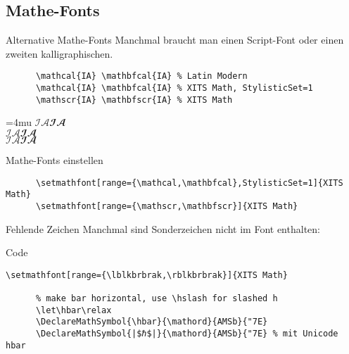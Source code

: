 \subsection{Mathe-Fonts}\label{sec:mathfonts}

\begin{frame}[fragile]{Alternative Mathe-Fonts}
  Manchmal braucht man einen Script-Font oder einen zweiten kalligraphischen.
  \vspace{1em}
  \begin{CodeExample}{0.83}
    \begin{lstlisting}
      \mathcal{IA} \mathbfcal{IA} % Latin Modern
      \mathcal{IA} \mathbfcal{IA} % XITS Math, StylisticSet=1
      \mathscr{IA} \mathbfscr{IA} % XITS Math
    \end{lstlisting}
  \CodeResult
    \Umathordordspacing\textstyle=4mu
    $\mathcal{I A} \mathbfcal{I A}$ \\
    { $\mathcal{I A} \mathbfcal{I A}$} \\
    $\mathscr{I A} \mathbfscr{I A}$
  \end{CodeExample}

  \begin{block}{Mathe-Fonts einstellen}
    \begin{lstlisting}
      \setmathfont[range={\mathcal,\mathbfcal},StylisticSet=1]{XITS Math}
      \setmathfont[range={\mathscr,\mathbfscr}]{XITS Math}
    \end{lstlisting}
  \end{block}
\end{frame}

\begin{frame}[fragile]{Fehlende Zeichen}
  Manchmal sind Sonderzeichen nicht im Font enthalten:
  \vspace{1em}
  \begin{block}{Code}
    \begin{lstlisting}[escapechar=|]
      \setmathfont[range={\lblkbrbrak,\rblkbrbrak}]{XITS Math}

      % make bar horizontal, use \hslash for slashed h
      \let\hbar\relax
      \DeclareMathSymbol{\hbar}{\mathord}{AMSb}{"7E}
      \DeclareMathSymbol{|$ℏ$|}{\mathord}{AMSb}{"7E} % mit Unicode hbar
    \end{lstlisting}
  \end{block}
\end{frame}
